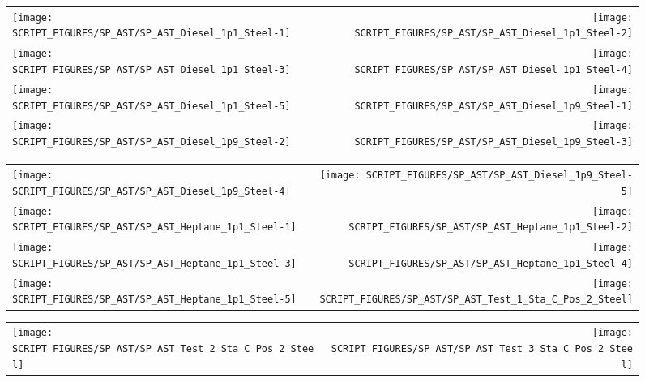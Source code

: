 \begin{figure}[p]
\begin{tabular*}{\textwidth}{l@{\extracolsep{\fill}}r}
\texttt{[image: SCRIPT\_FIGURES/SP\_AST/SP\_AST\_Diesel\_1p1\_Steel-1]} &
\texttt{[image: SCRIPT\_FIGURES/SP\_AST/SP\_AST\_Diesel\_1p1\_Steel-2]} \\
\texttt{[image: SCRIPT\_FIGURES/SP\_AST/SP\_AST\_Diesel\_1p1\_Steel-3]} &
\texttt{[image: SCRIPT\_FIGURES/SP\_AST/SP\_AST\_Diesel\_1p1\_Steel-4]} \\
\texttt{[image: SCRIPT\_FIGURES/SP\_AST/SP\_AST\_Diesel\_1p1\_Steel-5]} &
\texttt{[image: SCRIPT\_FIGURES/SP\_AST/SP\_AST\_Diesel\_1p9\_Steel-1]} \\
\texttt{[image: SCRIPT\_FIGURES/SP\_AST/SP\_AST\_Diesel\_1p9\_Steel-2]} &
\texttt{[image: SCRIPT\_FIGURES/SP\_AST/SP\_AST\_Diesel\_1p9\_Steel-3]}
\end{tabular*}
\end{figure}

\begin{figure}[p]
\begin{tabular*}{\textwidth}{l@{\extracolsep{\fill}}r}
\texttt{[image: SCRIPT\_FIGURES/SP\_AST/SP\_AST\_Diesel\_1p9\_Steel-4]} &
\texttt{[image: SCRIPT\_FIGURES/SP\_AST/SP\_AST\_Diesel\_1p9\_Steel-5]} \\
\texttt{[image: SCRIPT\_FIGURES/SP\_AST/SP\_AST\_Heptane\_1p1\_Steel-1]} &
\texttt{[image: SCRIPT\_FIGURES/SP\_AST/SP\_AST\_Heptane\_1p1\_Steel-2]} \\
\texttt{[image: SCRIPT\_FIGURES/SP\_AST/SP\_AST\_Heptane\_1p1\_Steel-3]} &
\texttt{[image: SCRIPT\_FIGURES/SP\_AST/SP\_AST\_Heptane\_1p1\_Steel-4]} \\
\texttt{[image: SCRIPT\_FIGURES/SP\_AST/SP\_AST\_Heptane\_1p1\_Steel-5]} &
\texttt{[image: SCRIPT\_FIGURES/SP\_AST/SP\_AST\_Test\_1\_Sta\_C\_Pos\_2\_Steel]}
\end{tabular*}
\end{figure}

\begin{figure}[p]
\begin{tabular*}{\textwidth}{l@{\extracolsep{\fill}}r}
\texttt{[image: SCRIPT\_FIGURES/SP\_AST/SP\_AST\_Test\_2\_Sta\_C\_Pos\_2\_Steel]} &
\texttt{[image: SCRIPT\_FIGURES/SP\_AST/SP\_AST\_Test\_3\_Sta\_C\_Pos\_2\_Steel]}
\end{tabular*}
\end{figure}

